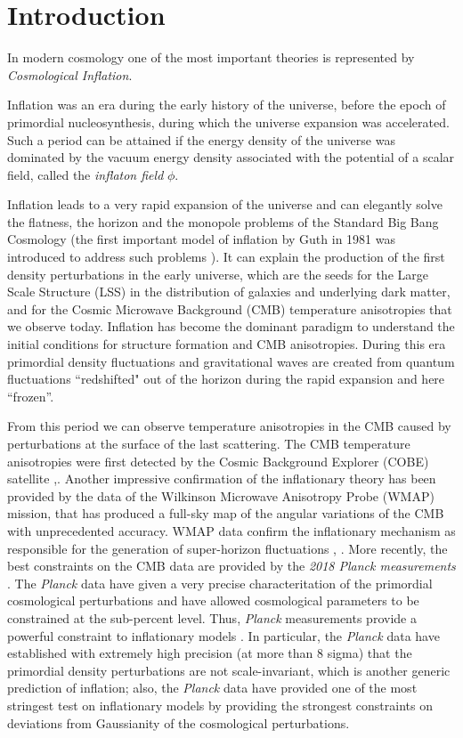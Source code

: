\documentclass[11pt,a4paper,twoside]{book}
\begin{document}
\chapter{Introduction}

In modern cosmology one of the most important theories is represented by \textit{Cosmological Inflation}. 

Inflation was an era during the early history of the universe, before the epoch of primordial nucleosynthesis, during which the universe expansion was accelerated. Such a period can be attained if the energy density of the universe was dominated by the vacuum energy density associated with the potential of a scalar field, called the \textit{inflaton field} $ \phi $. 

Inflation leads to a very rapid expansion of the universe and can elegantly solve the flatness, the horizon and the monopole problems of the Standard Big Bang Cosmology (the first important model of inflation by Guth in 1981 was introduced to address such problems \cite{Guth:Intro}). It can explain the production of the first density perturbations in the early universe, which are the seeds for the Large Scale Structure (LSS) in the distribution of galaxies and underlying dark matter, and for the Cosmic Microwave Background (CMB) temperature anisotropies that we observe today. Inflation has become the dominant paradigm to understand the initial conditions for structure formation and CMB anisotropies.
During this era primordial density fluctuations and gravitational waves are created from quantum fluctuations \textquotedblleft redshifted" out of the horizon during the rapid expansion and here \textquotedblleft frozen\textquotedblright.

 From this period we can observe temperature anisotropies in the CMB caused by perturbations at the surface of the last scattering. The CMB temperature anisotropies were first detected by the Cosmic Background Explorer (COBE) satellite \cite{COBE1:intro},\cite{COBE2:intro}. 
Another impressive confirmation of the inflationary theory has been provided by the data of the Wilkinson Microwave Anisotropy Probe (WMAP) mission, that has produced a full-sky map of the angular variations of the CMB with unprecedented accuracy. WMAP data confirm the inflationary mechanism as responsible for the generation of super-horizon fluctuations \cite{WMAP:intro}, \cite{NonGauss:Intro}.
More recently, the best constraints on the CMB data are provided by the \textit{2018 Planck measurements} \cite{Planck2018:intro}. The \textit{Planck} data have given a very precise characteritation of the primordial cosmological perturbations and have allowed cosmological parameters to be constrained at the sub-percent level. Thus, \textit{Planck} measurements provide  a powerful constraint to inflationary models \cite{Planck2013:Intro}. In particular, the \textit{Planck} data have established with extremely high precision (at more than 8 sigma) that the primordial density perturbations are not scale-invariant, which is another generic prediction of inflation; also, the \textit{Planck} data have provided one of the most stringest test on inflationary models by providing the strongest constraints on deviations from Gaussianity of the cosmological perturbations.
\end{document}
